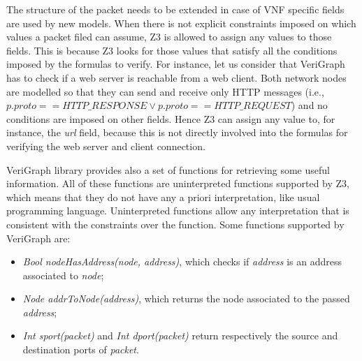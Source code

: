 The structure of the packet needs to be extended in case of VNF specific fields are used by new models. When there is not explicit constraints imposed on which values a packet filed can assume, Z3 is allowed to assign any values to those fields. This is because Z3 looks for those values that satisfy all the conditions imposed by the formulas to verify. For instance, let us consider that VeriGraph has to check if a web server is reachable from a web client. Both network nodes are modelled so that they can send and receive only HTTP messages (i.e., \textit{$p.proto == HTTP\_RESPONSE \vee p.proto == HTTP\_REQUEST$}) and no conditions are imposed on other fields. Hence Z3 can assign any value to, for instance, the \textit{url} field, because this is not directly involved into the formulas for verifying the web server and client connection.

VeriGraph library provides also a set of functions for retrieving some useful information. All of these functions are uninterpreted functions supported by Z3, which means that they do not have any a priori interpretation, like usual programming language. Uninterpreted functions allow any interpretation that is consistent with the constraints over the function. Some functions supported by VeriGraph are:
\begin{itemize}
	\item \textit{Bool nodeHasAddress(node, address)}, which checks if \textit{address} is an address associated to \textit{node};
	\item \textit{Node addrToNode(address)}, which returns the node associated to the passed \textit{address};
	\item \textit{Int sport(packet)} and \textit{Int dport(packet)} return respectively the source and destination ports of \textit{packet}.
\end{itemize} 

